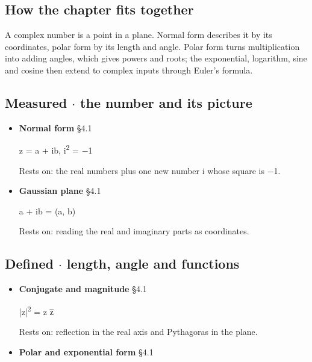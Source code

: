\documentclass[11pt]{article}
\begin{document}
\begin{keepsection}
\section{How the chapter fits together}

A complex number is a point in a plane. Normal form describes it by its coordinates, polar form by its length and angle. Polar form turns multiplication into adding angles, which gives powers and roots; the exponential, logarithm, sine and cosine then extend to complex inputs through Euler’s formula.

\subsection{Measured \ensuremath{\cdot} the number and its picture}

\begin{itemize}
\item {}
\textbf{Normal form} \hfill{\small\color{FAUblue}§4.1}

z = a + ib, i\textsuperscript{2} = \ensuremath{-}1

Rests on: the real numbers plus one new number i whose square is \ensuremath{-}1.
\item {}
\textbf{Gaussian plane} \hfill{\small\color{FAUblue}§4.1}

a + ib = (a, b)

Rests on: reading the real and imaginary parts as coordinates.
\end{itemize}

\subsection{Defined \ensuremath{\cdot} length, angle and functions}

\begin{itemize}
\item {}
\textbf{Conjugate and magnitude} \hfill{\small\color{FAUblue}§4.1}

|z|\textsuperscript{2} = z z̅

Rests on: reflection in the real axis and Pythagoras in the plane.
\item {}
\textbf{Polar and exponential form} \hfill{\small\color{FAUblue}§4.1}


\end{itemize}
\end{keepsection}
\end{document}

